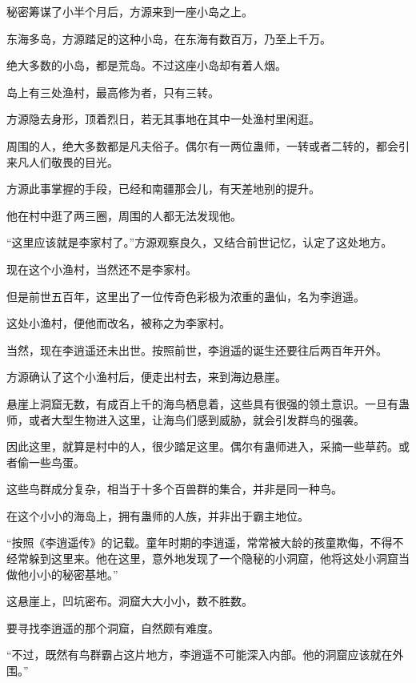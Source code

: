 
\begin{this_body}

秘密筹谋了小半个月后，方源来到一座小岛之上。

东海多岛，方源踏足的这种小岛，在东海有数百万，乃至上千万。

绝大多数的小岛，都是荒岛。不过这座小岛却有着人烟。

岛上有三处渔村，最高修为者，只有三转。

方源隐去身形，顶着烈日，若无其事地在其中一处渔村里闲逛。

周围的人，绝大多数都是凡夫俗子。偶尔有一两位蛊师，一转或者二转的，都会引来凡人们敬畏的目光。

方源此事掌握的手段，已经和南疆那会儿，有天差地别的提升。

他在村中逛了两三圈，周围的人都无法发现他。

“这里应该就是李家村了。”方源观察良久，又结合前世记忆，认定了这处地方。

现在这个小渔村，当然还不是李家村。

但是前世五百年，这里出了一位传奇色彩极为浓重的蛊仙，名为李逍遥。

这处小渔村，便他而改名，被称之为李家村。

当然，现在李逍遥还未出世。按照前世，李逍遥的诞生还要往后两百年开外。

方源确认了这个小渔村后，便走出村去，来到海边悬崖。

悬崖上洞窟无数，有成百上千的海鸟栖息着，这些具有很强的领土意识。一旦有蛊师，或者大型生物进入这里，让海鸟们感到威胁，就会引发群鸟的强袭。

因此这里，就算是村中的人，很少踏足这里。偶尔有蛊师进入，采摘一些草药。或者偷一些鸟蛋。

这些鸟群成分复杂，相当于十多个百兽群的集合，并非是同一种鸟。

在这个小小的海岛上，拥有蛊师的人族，并非出于霸主地位。

“按照《李逍遥传》的记载。童年时期的李逍遥，常常被大龄的孩童欺侮，不得不经常躲到这里来。他在这里，意外地发现了一个隐秘的小洞窟，他将这处小洞窟当做他小小的秘密基地。”

这悬崖上，凹坑密布。洞窟大大小小，数不胜数。

要寻找李逍遥的那个洞窟，自然颇有难度。

“不过，既然有鸟群霸占这片地方，李逍遥不可能深入内部。他的洞窟应该就在外围。”


\end{this_body}
